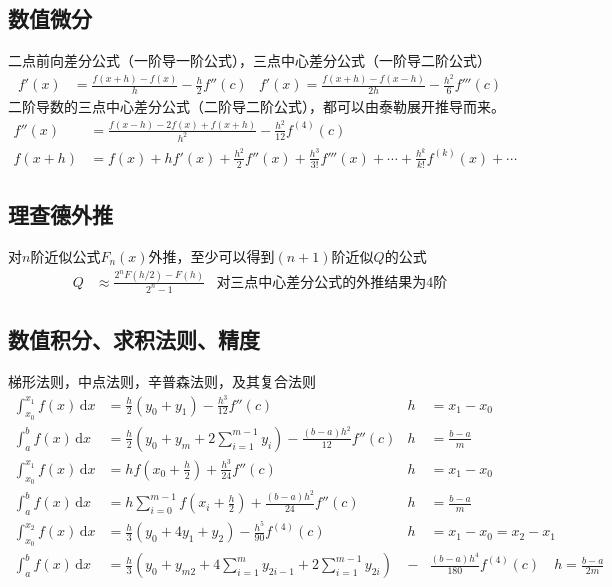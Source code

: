 \documentclass[twocolumn]{article}
\begin{document}
\subsection{数值微分}
二点前向差分公式（一阶导一阶公式），三点中心差分公式（一阶导二阶公式）
\begin{align*}
    f'(x) & =\frac{f(x+h)-f(x)}{h}-\frac{h}{2}f''(c) & f'(x)=\frac{f(x+h)-f(x-h)}{2h}-\frac{h^2}{6}f'''(c)
\end{align*}
二阶导数的三点中心差分公式（二阶导二阶公式），都可以由泰勒展开推导而来。
\begin{align*}
    f''(x) & =\frac{f(x-h)-2f(x)+f(x+h)}{h^2}-\frac{h^2}{12}f^{(4)}(c)                                     \\
    f(x+h) & =f(x)+hf'(x)+\frac{h^2}{2}f''(x)+\frac{h^3}{3!}f'''(x)+\cdots+\frac{h^k}{k!}f^{(k)}(x)+\cdots
\end{align*}

\subsection{理查德外推}
对$n$阶近似公式$F_n(x)$外推，至少可以得到$(n+1)$阶近似$Q$的公式
\begin{align*}
    Q &\approx \frac{2^nF(h/2)-F(h)}{2^n-1} & \text{对三点中心差分公式的外推结果为4阶}
\end{align*}

\subsection{数值积分、求积法则、精度}
梯形法则，中点法则，辛普森法则，及其复合法则
\begin{align*}
    \int_{x_0}^{x_1} f(x) \,\mathrm{d}x & = \frac{h}{2}(y_0+y_1)-\frac{h^3}{12}f''(c)                           & h & =x_1-x_0       \\
    \int_{a}^{b} f(x) \,\mathrm{d}x     & = \frac{h}{2}(y_0+y_m+2\sum_{i=1}^{m-1}y_i)-\frac{(b-a)h^2}{12}f''(c) & h & =\frac{b-a}{m}\\
    \int_{x_0}^{x_1} f(x) \,\mathrm{d}x & =hf(x_0+\frac{h}{2})+\frac{h^3}{24}f''(c)                       & h & =x_1-x_0       \\
    \int_{a}^{b} f(x) \,\mathrm{d}x     & =h\sum_{i=0}^{m-1}f(x_i+\frac{h}{2})+\frac{(b-a)h^2}{24}f''(c) & h & =\frac{b-a}{m}\\
    \int_{x_0}^{x_2} f(x) \,\mathrm{d}x & = \frac{h}{3}(y_0+4y_1+y_2)-\frac{h^5}{90}f^{(4)}(c)&h&=x_1-x_0 = x_2-x_1                                   \\
    \int_{a}^{b} f(x) \,\mathrm{d}x     & = \frac{h}{3}(y_0+y_{m2}+4\sum_{i=1}^{m}y_{2i-1}+2\sum_{i=1}^{m-1}y_{2i})&-&\frac{(b-a)h^4}{180}f^{(4)}(c)\quad h=\frac{b-a}{2m}
\end{align*}
\end{document}
